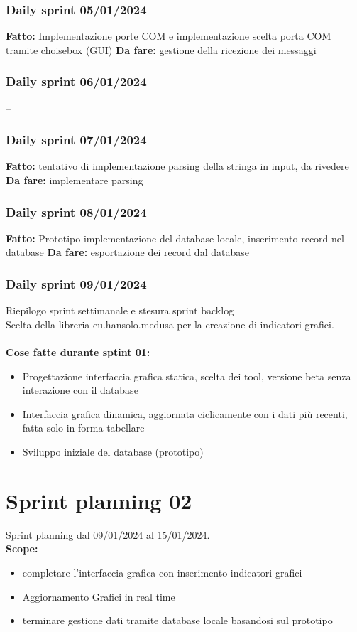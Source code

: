\documentclass{report}
\begin{document}
\subsection{Daily sprint 05/01/2024}
\textbf{Fatto:} Implementazione porte COM e implementazione scelta porta COM tramite choisebox (GUI)
\textbf{Da fare:} gestione della ricezione dei messaggi
\subsection{Daily sprint 06/01/2024}
--
\subsection{Daily sprint 07/01/2024}
\textbf{Fatto:} tentativo di implementazione parsing della stringa in input, da rivedere
\textbf{Da fare:} implementare parsing
\subsection{Daily sprint 08/01/2024}
\textbf{Fatto:} Prototipo implementazione del database locale, inserimento record nel database
\textbf{Da fare:} esportazione dei record dal database
\subsection{Daily sprint 09/01/2024}
Riepilogo sprint settimanale e stesura sprint backlog\\
Scelta della libreria eu.hansolo.medusa per la creazione di indicatori grafici.\\\\

\textbf{Cose fatte durante sptint 01:}
\begin{itemize}
\item Progettazione interfaccia grafica statica, scelta dei tool, versione beta senza interazione con il database
\item Interfaccia grafica dinamica, aggiornata ciclicamente con i dati più recenti, fatta solo in forma tabellare
\item Sviluppo iniziale del database (prototipo)
\end{itemize}

\chapter{Sprint planning 02}
Sprint planning dal 09/01/2024 al 15/01/2024.\\

\textbf{Scope:}
\begin{itemize}
\item completare l'interfaccia grafica con inserimento indicatori grafici
\item Aggiornamento Grafici in real time 
\item terminare gestione dati tramite database locale basandosi sul prototipo
\end{itemize}
\end{document}
